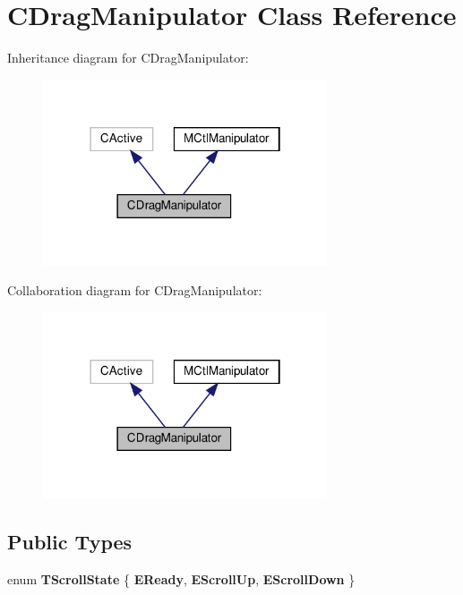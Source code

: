 \hypertarget{classCDragManipulator}{}\section{C\+Drag\+Manipulator Class Reference}
\label{classCDragManipulator}


Inheritance diagram for C\+Drag\+Manipulator\+:
\nopagebreak
\begin{figure}[H]
\begin{center}
\leavevmode
\includegraphics[width=238pt]{classCDragManipulator__inherit__graph}
\end{center}
\end{figure}


Collaboration diagram for C\+Drag\+Manipulator\+:
\nopagebreak
\begin{figure}[H]
\begin{center}
\leavevmode
\includegraphics[width=238pt]{classCDragManipulator__coll__graph}
\end{center}
\end{figure}
\subsection*{Public Types}
\begin{DoxyCompactItemize}
\item 
\mbox{\label{classCDragManipulator_a23f98fce4819a2420775120994cf4ebb}} 
enum {\bfseries T\+Scroll\+State} \{ {\bfseries E\+Ready}, 
{\bfseries E\+Scroll\+Up}, 
{\bfseries E\+Scroll\+Down}
 \}
\end{DoxyCompactItemize}
